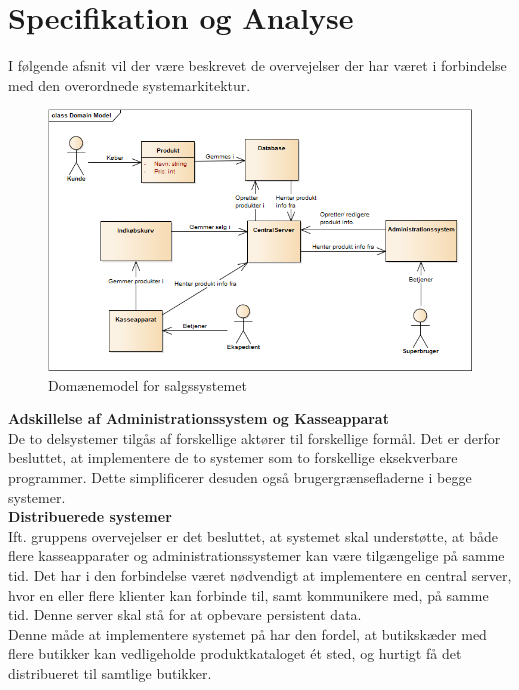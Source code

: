 \section{Specifikation og Analyse} \label{section:specanal}

I følgende afsnit vil der være beskrevet de overvejelser der har været i forbindelse med den overordnede systemarkitektur.

\begin{figure}[H]
	\centering
	\includegraphics[width=1\textwidth]{Projektbeskrivelse/Images/DomainModel.png}
	\caption{Domænemodel for salgssystemet}
	\label{fig:domain}
\end{figure}


\textbf{Adskillelse af Administrationssystem og Kasseapparat}\\
De to delsystemer tilgås af forskellige aktører til forskellige formål. Det er derfor besluttet, at implementere de to systemer som to forskellige eksekverbare programmer. Dette simplificerer desuden også brugergrænsefladerne i begge systemer.\\

\textbf{Distribuerede systemer}\\
Ift. gruppens overvejelser er det besluttet, at systemet skal understøtte, at både flere kasseapparater og administrationssystemer kan være tilgængelige på samme tid. Det har i den forbindelse været nødvendigt at implementere en central server, hvor en eller flere klienter kan forbinde til, samt kommunikere med, på samme tid. Denne server skal stå for at opbevare persistent data.\\

Denne måde at implementere systemet på har den fordel, at butikskæder med flere butikker kan vedligeholde produktkataloget ét sted, og hurtigt få det distribueret til samtlige butikker.\\

